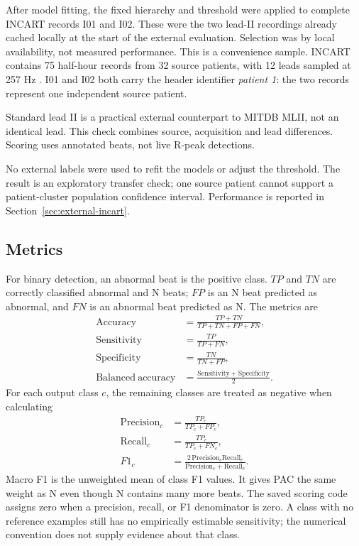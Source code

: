 After model fitting, the fixed hierarchy and threshold were applied to
complete INCART records I01 and I02. These were the two lead-II recordings
already cached locally at the start of the external evaluation. Selection was by local
availability, not measured performance. This is a convenience sample.
INCART contains 75 half-hour records from 32 source patients, with 12 leads
sampled at 257 Hz \cite{incartdb}. I01 and I02 both carry the header identifier
\emph{patient 1}: the two records represent one independent source patient.

Standard lead II is a practical external counterpart to MITDB MLII, not an
identical lead. This check combines source, acquisition and lead differences.
Scoring uses annotated beats, not live R-peak detections.

No external labels were used to refit the models or adjust the threshold.
The result is an exploratory transfer check; one source patient cannot
support a patient-cluster population confidence interval. Performance is
reported in Section~\ref{sec:external-incart}.

\subsection{Metrics}

For binary detection, an abnormal beat is the positive class. $TP$ and $TN$
are correctly classified abnormal and N beats; $FP$ is an N beat predicted
as abnormal, and $FN$ is an abnormal beat predicted as N. The metrics are
\begin{align}
 \mathrm{Accuracy}&=\frac{TP+TN}{TP+TN+FP+FN},\\
 \mathrm{Sensitivity}&=\frac{TP}{TP+FN},\\
 \mathrm{Specificity}&=\frac{TN}{TN+FP},\\
 \mathrm{Balanced\ accuracy}&=\frac{\mathrm{Sensitivity}+\mathrm{Specificity}}{2}.
\end{align}
For each output class $c$, the remaining classes are treated as negative
when calculating
\begin{align}
 \mathrm{Precision}_c&=\frac{TP_c}{TP_c+FP_c},\\
 \mathrm{Recall}_c&=\frac{TP_c}{TP_c+FN_c},\\
 F1_c&=\frac{2\,\mathrm{Precision}_c\mathrm{Recall}_c}
 {\mathrm{Precision}_c+\mathrm{Recall}_c}.
\end{align}
Macro F1 is the unweighted mean of class F1 values. It gives PAC the same
weight as N even though N contains many more beats. The saved scoring code
assigns zero when a precision, recall, or F1 denominator is zero. A class
with no reference examples still has no empirically estimable sensitivity;
the numerical convention does not supply evidence about that class.

